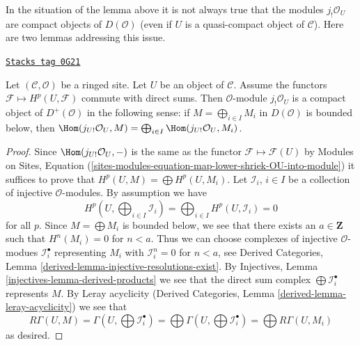 In the situation of the lemma above it is not always true that the
modules $j_!\mathcal{O}_U$ are compact objects of $D(\mathcal{O})$
(even if $U$ is a quasi-compact object of $\mathcal{C}$).
Here are two lemmas addressing this issue.


\begin{lemma}
\label{sites-cohomology-lemma-when-jshriek-lower-compact}
\href{https://stacks.math.columbia.edu/tag/0G21}{\texttt{Stacks tag 0G21}}

Let $(\mathcal{C}, \mathcal{O})$ be a ringed site. Let $U$ be an object of
$\mathcal{C}$. Assume the functors $\mathcal{F} \mapsto H^p(U, \mathcal{F})$
commute with direct sums. Then $\mathcal{O}$-module $j_!\mathcal{O}_U$ is a
compact object of $D^+(\mathcal{O})$ in the following sense:
if $M = \bigoplus_{i \in I} M_i$ in $D(\mathcal{O})$ is
bounded below, then $\Hom(j_{U!}\mathcal{O}_U, M) =
\bigoplus_{i \in I} \Hom(j_{U!}\mathcal{O}_U, M_i)$.
\end{lemma}

\begin{proof}
Since $\Hom(j_{U!}\mathcal{O}_U, -)$ is the same as the functor
$\mathcal{F} \mapsto \mathcal{F}(U)$ by
Modules on Sites, Equation
(\ref{sites-modules-equation-map-lower-shriek-OU-into-module}) it suffices
to prove that $H^p(U, M) = \bigoplus H^p(U, M_i)$.
Let $\mathcal{I}_i$, $i \in I$ be a collection of injective
$\mathcal{O}$-modules. By assumption we have
$$
H^p(U, \bigoplus\nolimits_{i \in I} \mathcal{I}_i) =
\bigoplus\nolimits_{i \in I} H^p(U, \mathcal{I}_i) = 0
$$
for all $p$. Since $M = \bigoplus M_i$ is bounded below, we
see that there exists an $a \in \mathbf{Z}$ such that $H^n(M_i) = 0$
for $n < a$. Thus we can choose complexes of injective $\mathcal{O}$-modues
$\mathcal{I}_i^\bullet$ representing $M_i$
with $\mathcal{I}_i^n = 0$ for $n < a$, see
Derived Categories, Lemma \ref{derived-lemma-injective-resolutions-exist}.
By Injectives, Lemma \ref{injectives-lemma-derived-products}
we see that the direct sum complex $\bigoplus \mathcal{I}_i^\bullet$
represents $M$. By Leray acyclicity
(Derived Categories, Lemma \ref{derived-lemma-leray-acyclicity})
we see that
$$
R\Gamma(U, M) = \Gamma(U, \bigoplus \mathcal{I}_i^\bullet) =
\bigoplus \Gamma(U, \bigoplus \mathcal{I}_i^\bullet) =
\bigoplus R\Gamma(U, M_i)
$$
as desired.
\end{proof}

